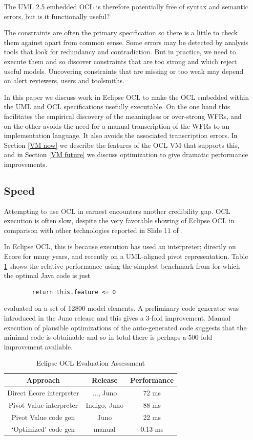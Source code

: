 \documentclass{acm_proc_article-sp}
\begin{document}
The UML 2.5 embedded OCL is therefore potentially free of syntax and semantic errors, but is it functionally useful?

The constraints are often the primary specification so there is a little to check them against apart from common sense.
Some errors may be detected by analysis tools that look for redundancy and contradiction. But in practice, we need to
execute them and so discover constraints that are too strong and which reject useful models. Uncovering constraints
that are missing or too weak may depend on alert reviewers, users and toolsmiths.

In this paper we discuss work in Eclipse OCL to make the OCL embedded within the UML and OCL specifications usefully
executable. On the one hand this facilitates the empirical discovery of the meaningless or over-strong WFRs, and on the other avoids the need for a manual transcription of the WFRs to an implementation language. It also avoids the associated transcription errors. In Section \ref{VM now} we describe the features of the OCL VM that supports this, and in Section \ref{VM future} we discuss optimization to give dramatic performance improvements. 

\subsection{Speed}
Attempting to use OCL in earnest encounters another credibility gap. OCL execution is often slow, despite the very favorable showing of Eclipse OCL in comparison with other technologies reported in Slide 11 of \cite{Rath-Queries}.

In Eclipse OCL, this is because execution has used an interpreter; directly on Ecore for many years, and recently
on a UML-aligned pivot representation. Table \ref{Evaluator performance} shows the relative performance using the simplest benchmark from \cite{Rath-Queries} for which the optimal Java code is just
\begin{verbatim}        return this.feature <= 0\end{verbatim}
 evaluated on a set of 12800 model elements.
A preliminary code generator was introduced in the Juno release and this gives a 3-fold
improvement. Manual execution of plausible optimizations of the auto-generated code suggests that the minimal code is obtainable and so in total there is perhaps a 500-fold improvement available. 

\begin{table}
\centering
\caption{Eclipse OCL Evaluation Assessment}\label{Evaluator performance}
\begin{tabular}{|c|c|c|} \hline
Approach&Release&Performance\\ \hline
Direct Ecore interpreter & ..., Juno & 72 ms\\ \hline
Pivot Value interpreter & Indigo, Juno & 88 ms \\ \hline
Pivot Value code gen & Juno & 22 ms \\ \hline
`Optimized' code gen & manual & 0.13 ms \\ \hline
\end{tabular}
\end{table}
\end{document}
